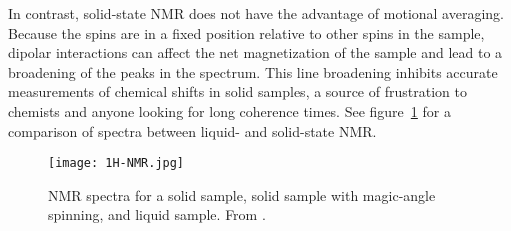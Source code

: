 In contrast, solid-state NMR does not have the advantage of motional averaging. Because the spins are in a fixed position relative to other spins in the sample, dipolar interactions can affect the net magnetization of the sample and lead to a broadening of the peaks in the spectrum. This line broadening inhibits accurate measurements of chemical shifts in solid samples, a source of frustration to chemists and anyone looking for long coherence times. See figure~\ref{fig:NMR-averaging} for a comparison of spectra between liquid- and solid-state NMR.

\begin{figure}[H]
    \centering
    \texttt{[image: 1H-NMR.jpg]}
    \caption{NMR spectra for a solid sample, solid sample with magic-angle spinning, and liquid sample. From \cite{Ottowa-NMR}.}
    \label{fig:NMR-averaging}
\end{figure}



%
%



